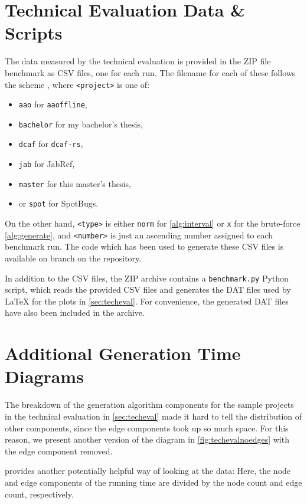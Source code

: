 \section{Technical Evaluation Data \& Scripts}\label{app:techdata}
The data measured by the technical evaluation is provided in the ZIP file \gls{benchmark} as CSV files, one for each run.
The filename for each of these follows the scheme , where \texttt{<project>} is one of:
\begin{itemize}
	\item \texttt{aao} for \texttt{aaoffline},
	\item \texttt{bachelor} for my bachelor's thesis,
	\item \texttt{dcaf} for \texttt{dcaf-rs},
	\item \texttt{jab} for JabRef,
	\item \texttt{master} for this master's thesis,
	\item or \texttt{spot} for SpotBugs.
\end{itemize}
On the other hand, \texttt{<type>} is either \texttt{norm} for \cref{alg:interval} or \texttt{x} for the brute-force \cref{alg:generate}, and \texttt{<number>} is just an ascending number assigned to each benchmark run.
The code which has been used to generate these CSV files is available on branch  on the \SEE{} repository.

In addition to the CSV files, the ZIP archive contains a \texttt{benchmark.py} Python script, which reads the provided CSV files and generates the DAT files used by \LaTeX{} for the plots in \cref{sec:techeval}.
For convenience, the generated DAT files have also been included in the archive.

\section{Additional Generation Time Diagrams}\label{app:techeval}
The breakdown of the generation algorithm components for the sample projects in the technical evaluation in \cref{sec:techeval} made it hard to tell the distribution of other components, since the edge components took up so much space.
For this reason, we present another version of the diagram in \cref{fig:techevalnoedges} with the edge component removed.

 provides another potentially helpful way of looking at the data:
Here, the node and edge components of the running time are divided by the node count and edge count, respectively.

